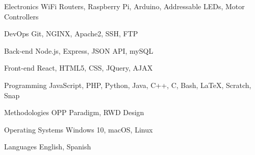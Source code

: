 

\begin{cvskills}

  \cvskill
    {Electronics} %
    {WiFi Routers, Raspberry Pi, Arduino, Addressable LEDs, Motor Controllers } %

  \cvskill
    {DevOps} %
    {Git, NGINX, Apache2, SSH, FTP} %

  \cvskill
    {Back-end} %
    {Node.js, Express, JSON API, mySQL} %

  \cvskill
    {Front-end} %
    {React, HTML5, CSS, JQuery, AJAX} %

  \cvskill
    {Programming} %
    {JavaScript, PHP, Python, Java, C++, C, Bash, LaTeX, Scratch, Snap} %

  \cvskill
    {Methodologies} %
    {OPP Paradigm, RWD Design} %

  \cvskill
    {Operating Systems} %
    {Windows 10, macOS, Linux} %


  \cvskill
    {Languages} %
    {English, Spanish} %


\end{cvskills}
